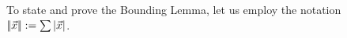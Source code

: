\documentclass[manuscript,screen]{acmart}
\newcommand{\dfn}{:=}
\newcommand{\red}[1]{{\color{red}#1}}
\newcommand{\anupam}[1]{\todo{A: #1}}
\newtheorem{lem}[thm]{Lemma}
\theoremstyle{definition}
\theoremstyle{remark}
\newcommand{\permpref}{\subset}
\newcommand{\sumlen}[1]{|\hspace{-.15em}|#1|\hspace{-.15em}|}
\newcommand{\bc}{\mathsf{B}}
\newcommand{\bcwfpo}[1]{\bc^{#1}}
\newcommand{\nested}{\mathsf{N}}
\newcommand{\nbcwfpo}[1]{\nested\bcwfpo{#1}}
\newcommand{\bcpp}{\bcwfpo{\permpref}}
\newcommand{\nbcpp}{\nbcwfpo{\permpref}}
\begin{document}
To state and prove the Bounding Lemma, let us employ the notation $\sumlen{\vec x} \dfn \sum |\vec x|$. 
\end{document}
